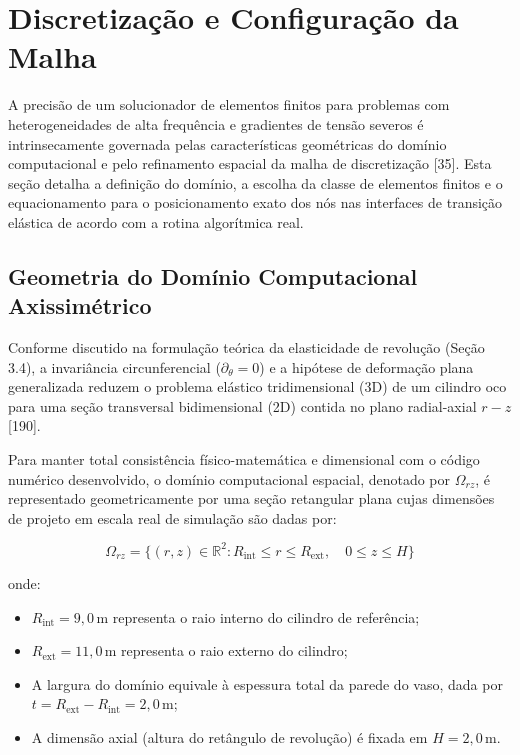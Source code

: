 \section{Discretização e Configuração da Malha}\label{sec:discretizacao_malha}

A precisão de um solucionador de elementos finitos para problemas com heterogeneidades de alta frequência e gradientes de tensão severos é intrinsecamente governada pelas características geométricas do domínio computacional e pelo refinamento espacial da malha de discretização [35]. Esta seção detalha a definição do domínio, a escolha da classe de elementos finitos e o equacionamento para o posicionamento exato dos nós nas interfaces de transição elástica de acordo com a rotina algorítmica real.

\subsection{Geometria do Domínio Computacional Axissimétrico}

Conforme discutido na formulação teórica da elasticidade de revolução (Seção 3.4), a invariância circunferencial ($\partial_{\theta} = 0$) e a hipótese de deformação plana generalizada reduzem o problema elástico tridimensional (3D) de um cilindro oco para uma seção transversal bidimensional (2D) contida no plano radial-axial $r-z$ [190].

Para manter total consistência físico-matemática e dimensional com o código numérico desenvolvido, o domínio computacional espacial, denotado por $\Omega_{rz}$, é representado geometricamente por uma seção retangular plana cujas dimensões de projeto em escala real de simulação são dadas por:

\begin{equation}
  \Omega_{rz} = \{ (r, z) \in \mathbb{R}^2 : R_{\text{int}} \le r \le R_{\text{ext}} , \quad 0 \le z \le H \}
  \label{eq:dominio_mef}
\end{equation}

onde:
\begin{itemize}
  \item $R_{\text{int}} = 9,0 \, \text{m}$ representa o raio interno do cilindro de referência;
  \item $R_{\text{ext}} = 11,0 \, \text{m}$ representa o raio externo do cilindro;
  \item A largura do domínio equivale à espessura total da parede do vaso, dada por $t = R_{\text{ext}} - R_{\text{int}} = 2,0 \, \text{m}$;
  \item A dimensão axial (altura do retângulo de revolução) é fixada em $H = 2,0 \, \text{m}$.
\end{itemize}

